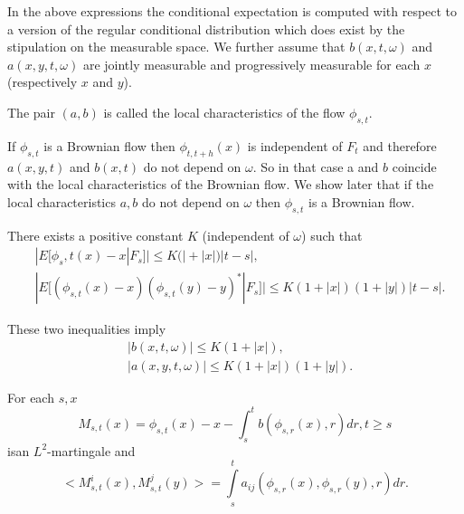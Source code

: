 In the above expressions the conditional expectation is computed with
respect to a version of the regular conditional distribution which
does exist by the stipulation on the measurable space. We further
assume that $b (x,t,\omega)$ and $a (x,y,t,\omega)$ are jointly
measurable and progressively measurable for each $x$ (respectively $x$
and $y$). 

\begin{definition}\label{c2:def2.1.1}%
  The pair $(a, b)$ is called the local characteristics of the flow
  $\phi_{s, t}$. 
\end{definition}

\setcounter{remark}{1}
\begin{remark}\label{c2:rem2.1.2}%
  If $\phi_{s, t} $ is a Brownian flow then $\phi_{t,t+h} (x)$ is
  independent of $F_t$ and therefore $a(x, y, t)$ and $b(x, t)$ do not
  depend on $\omega$. So in that case a and $b$ coincide with the
  local characteristics of the Brownian flow. We show later that if
  the local characteristics $a, b$ do not depend on $\omega$ then
  $\phi_{s, t} $ is a Brownian flow.  
\end{remark}

\begin{Assumption}\label{c2:asm2}%
There exists a positive constant $K$ (independent of $\omega$) such that 
\begin{align*}
  & | E [ \phi_s,t (x) - x |F_s ] | \le K(|+|x|) |t-s|, \tag{2.1.1}\\
  & | E [(\phi_{s,t}(x) - x) (\phi_{s,t} (y) - y)^\ast |F_s ]| \le K(1+|x|)
  (1+|y|) |t-s|. \tag{2.1.2}\label{c2:eq2.1.2} 
\end{align*}
\end{Assumption}

These two inequalities imply
\begin{align*}
  & | b(x,t, \omega) | \le K(1 + |x|), \tag{2.1.3}\label{c2:eq2.1.3}\\
  & | a(x, y, t, \omega) | \le K (1+ |x|) (1+|y|). \tag{2.1.4}\label{c2:eq2.1.4}
\end{align*}

\setcounter{Lemma}{2}
\begin{Lemma}\label{c2:lem2.1.3}%
  For each $s, x$
  \begin{equation*}
    M_{s,t}(x) = \phi_{s, t} (x) - x - \int_s^t b(\phi_{s, r} (x), r)
    dr, t \ge s \tag {2.1.5}\label{c2:eq2.1.5} 
  \end{equation*}
  is\pageoriginale an $L^2$-martingale and 
  \begin{equation*}
    < M^i_{s,t}(x), M^j_{s,t}(y) > = \int\limits_s^t
    a_{ij}(\phi_{s,r}(x), \phi_{s,r}(y),r)dr. \tag{2.1.6}\label{c2:eq2.1.6} 
  \end{equation*}
\end{Lemma}

